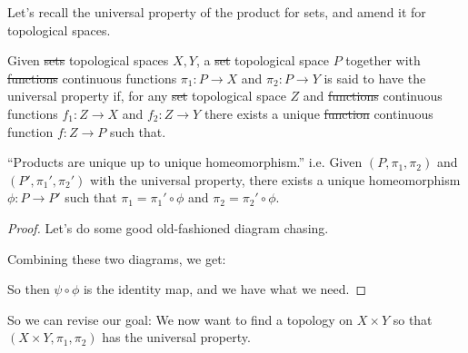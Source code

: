 \documentclass[12pt, twosided]{article}
\begin{document}
  Let's recall the universal property of the product for sets, and amend it for topological spaces.
  \begin{thm}
    Given \sout{sets} {\color{red} topological spaces} \(X, Y\), a \sout{set} {\color{red} topological space} \(P\) together with \sout{functions} {\color{red} continuous functions} \(\pi_1: P \to X\) and \(\pi_2: P \to Y\) is said to have the universal property if, for any \sout{set} {\color{red} topological space} \(Z\) and \sout{functions} {\color{red} continuous functions} \(f_1: Z \to X\) and \(f_2: Z \to Y\) there exists a unique \sout{function} {\color{red} continuous function} \(f: Z \to P\) such that.

    \begin{center}
    \end{center}
  \end{thm}
  \begin{prop}
    ``Products are unique up to unique homeomorphism.''
    i.e. Given \((P, \pi_1, \pi_2)\) and \((P\prime, \pi_1\prime, \pi_2\prime)\) with the universal property, there exists a unique homeomorphism \(\phi: P \to P\prime\) such that \(\pi_1 = \pi_1\prime \circ \phi\) and \(\pi_2 = \pi_2\prime \circ \phi\). 
  \end{prop}
  \begin{proof} Let's do some good old-fashioned diagram chasing.
    \begin{center}
    \end{center}
    Combining these two diagrams, we get:
    \begin{center}
    \end{center}
    So then \(\psi \circ \phi\) is the identity map, and we have what we need.
  \end{proof}
    So we can revise our goal: We now want to find a topology on \(X \times Y\) so that \((X \times Y, \pi_1, \pi_2)\) has the universal property.
\end{document}

